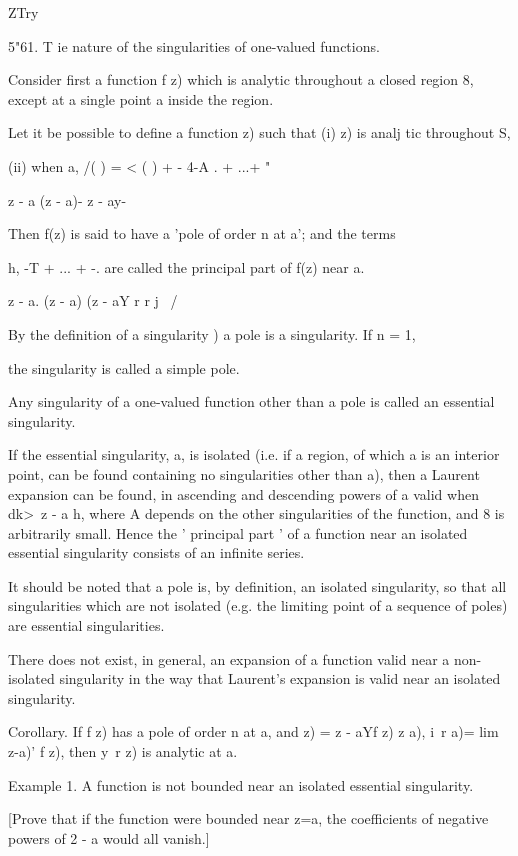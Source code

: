 {{{{ZTry

5"61. T ie nature of the singularities of one-valued functions.

Consider first a function f z) which is analytic throughout a closed
region 8, except at a single point a inside the region.

Let it be possible to define a function z) such that (i) z) is analj
tic throughout S,

(ii) when a, /( ) = < ( ) + - 4-A . + ...+ "

z - a (z - a)- z - ay-

Then f(z) is said to have a 'pole of order n at a'; and the terms

h, -T + ... + -. are called the principal part of f(z) near a.

z - a. (z - a) (z - aY r r j \ /

By the definition of a singularity ) a pole is a singularity.
If n = 1,

the singularity is called a simple pole.

Any singularity of a one-valued function other than a pole is called
an essential singularity.

If the essential singularity, a, is isolated (i.e. if a region, of
which a is an interior point, can be found containing no singularities
other than a), then a Laurent expansion can be found, in ascending and
descending powers of a valid when dk>\ z - a h, where A depends on the
other singularities of the function, and 8 is arbitrarily small. Hence
the ' principal part ' of a function near an isolated essential
singularity consists of an infinite series.

It should be noted that a pole is, by definition, an isolated
singularity, so that all singularities which are not isolated (e.g.
the limiting point of a sequence of poles) are essential
singularities.

There does not exist, in general, an expansion of a function valid
near a non-isolated singularity in the way that Laurent's expansion is
valid near an isolated singularity.

Corollary. If f z) has a pole of order n at a, and z) = z - aYf z) z
a), i\ r a)= lim z-a)' f z), then y\ r z) is analytic at a.

Example 1. A function is not bounded near an isolated essential
singularity.

[Prove that if the function were bounded near z=a, the coefficients of
negative powers of 2 - a would all vanish.]

}}}}
